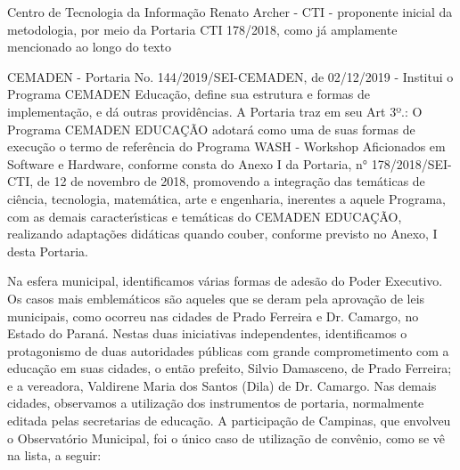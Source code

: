\documentclass[
12pt,		%
openright,	%
twoside,  %
a4paper,			%
chapter=TITLE,		%
english,			%
french,				%
spanish,			%
brazil				%
]{USPSC-classe/USPSC}
\begin{document}
\begin{alineas}
\item Centro de Tecnologia da Informa\c{c}\~ao Renato Archer - CTI - proponente inicial da metodologia, por meio da Portaria CTI 178/2018, como j\'a amplamente mencionado ao longo do texto
\item CEMADEN - Portaria No. 144/2019/SEI-CEMADEN, de 02/12/2019 - Institui o Programa CEMADEN Educa\c{c}\~ao, define sua estrutura e formas de implementa\c{c}\~ao, e d\'a outras provid\^encias. A Portaria traz em seu Art 3º.: O Programa CEMADEN EDUCA\c{C}\~AO adotar\'a como uma de suas formas de execu\c{c}\~ao o termo de refer\^encia do Programa WASH - Workshop Aficionados em Software e Hardware, conforme consta do Anexo I da Portaria, n° 178/2018/SEI-CTI, de 12 de novembro de 2018, promovendo a integra\c{c}\~ao das tem\'aticas de ci\^encia, tecnologia, matem\'atica, arte e engenharia, inerentes a aquele Programa, com as demais caracter\'{\i}sticas e tem\'aticas do CEMADEN EDUCA\c{C}\~AO, realizando adapta\c{c}\~oes did\'aticas quando couber, conforme previsto no Anexo, I desta Portaria.
\end{alineas}

Na esfera municipal, identificamos  v\'arias formas de ades\~ao do Poder Executivo. Os casos mais emblem\'aticos s\~ao aqueles que se deram pela aprova\c{c}\~ao de leis municipais, como ocorreu nas cidades de Prado Ferreira e Dr. Camargo, no Estado do Paran\'a. Nestas duas iniciativas independentes, identificamos o protagonismo de duas autoridades p\'ublicas com grande comprometimento com a educa\c{c}\~ao em suas cidades, o ent\~ao prefeito, Silvio Damasceno, de Prado Ferreira; e a vereadora, Valdirene Maria dos Santos (Dila)  de Dr. Camargo. Nas demais cidades, observamos a utiliza\c{c}\~ao dos instrumentos de portaria, normalmente editada pelas secretarias de educa\c{c}\~ao. A participa\c{c}\~ao de Campinas, que envolveu o Observat\'orio Municipal, foi o \'unico caso de utiliza\c{c}\~ao de conv\^enio, como se v\^e na lista, a seguir:
\end{document}

